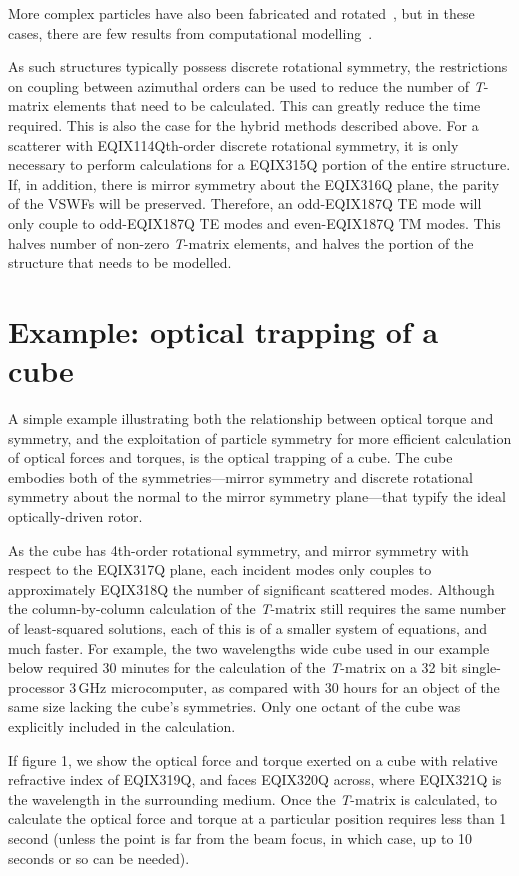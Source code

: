 More complex particles have also been fabricated and
rotated~\cite{galajda2001,luo2000,ukita2002}, but in these cases,
there are few results from computational modelling~\cite{collett2003}.

As such structures typically possess discrete rotational symmetry,
the restrictions on coupling between azimuthal orders can be used
to reduce the number of \textit{T}-matrix elements that need to
be calculated. This can greatly reduce the time required. This
is also the case for the hybrid methods described above. For a scatterer
with EQIX114Qth-order discrete rotational symmetry, it is only necessary
to perform calculations for a EQIX315Q portion of the entire structure.
If, in addition, there is mirror symmetry about the EQIX316Q plane, the
parity of the VSWFs will be preserved. Therefore, an odd-EQIX187Q TE mode
will only couple to odd-EQIX187Q TE modes and even-EQIX187Q TM modes. This halves
number of non-zero \textit{T}-matrix elements, and halves the portion
of the structure that needs to be modelled.

\section{Example: optical trapping of a cube}

A simple example illustrating both the relationship between optical
torque and symmetry, and the exploitation of particle symmetry for
more efficient calculation of optical forces and torques,
is the optical trapping of a cube. The cube embodies both
of the symmetries---mirror symmetry and discrete rotational
symmetry about the normal to the mirror symmetry plane---that
typify the ideal optically-driven rotor.

As the cube has 4th-order rotational symmetry, and mirror symmetry
with respect to the EQIX317Q plane, each incident modes only couples to
approximately EQIX318Q the number of significant scattered modes.
Although the column-by-column calculation of the \textit{T}-matrix
still requires the same number of least-squared solutions, each of
this is of a smaller system of equations, and much faster.
For example, the two wavelengths wide cube used in our example below
required 30 minutes for the calculation of the \textit{T}-matrix
on a 32 bit single-processor 3\,GHz microcomputer, as compared with
30 hours for an object of the same size lacking the cube's symmetries.
Only one octant of the cube was explicitly included in the
calculation.

If figure 1, we show the optical force and torque exerted on a
cube with relative refractive index of EQIX319Q, and faces
EQIX320Q across, where EQIX321Q is the wavelength in the surrounding
medium. Once the \textit{T}-matrix is calculated, to calculate the
optical force and torque at a particular position requires less than
1 second (unless the point is far from the beam focus, in which case,
up to 10 seconds or so can be needed).

